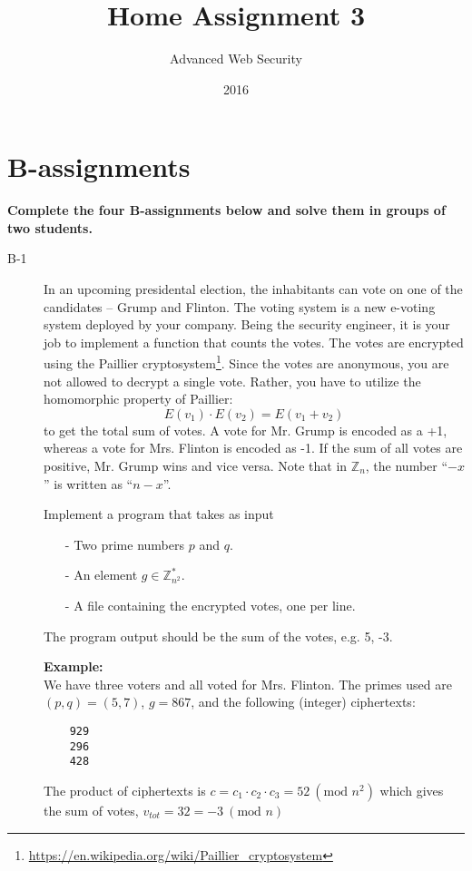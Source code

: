 \documentclass{article}
\begin{document}
\title{Home Assignment 3}
\author{Advanced Web Security}
\date{2016}

\maketitle

\section*{B-assignments}
\textbf{Complete the four B-assignments below and solve them in groups of two students.}

\begin{description}

	\item[B-1]{In an upcoming presidental election, the inhabitants can vote on one of the candidates --
	Grump and Flinton. The voting system is a new e-voting system deployed by your company. Being the
	security engineer, it is your job to implement a function that counts the votes. The votes are encrypted
	using the Paillier cryptosystem\footnote{\url{https://en.wikipedia.org/wiki/Paillier_cryptosystem}}. Since the votes are anonymous, you are not allowed to decrypt a single vote.
	Rather, you have to utilize the homomorphic property of Paillier:
	\[
	E(v_1) \cdot E(v_2) = E(v_1 + v_2)
	\]	
	to get the total sum of votes. A vote for Mr. Grump is encoded as a +1, whereas a vote for Mrs. Flinton
	is encoded as -1. If the sum of all votes are positive, Mr. Grump wins and vice versa. Note that in
	$\mathbb{Z}_n$, the number ``$-x$'' is written as ``$n-x$''.
    
    Implement a program that takes as input
	\begin{itemize}
		\item[-] Two prime numbers $p$ and $q$.
		\item[-] An element $g \in \mathbb{Z}_{n^2}^{*}$.
		\item[-] A file containing the encrypted votes, one per line.
	\end{itemize}

	The program output should be the sum of the votes, e.g. 5, -3.
	
	\textbf{Example:}\\
	We have three voters and all voted for Mrs. Flinton. The primes used are
	$(p, q) = (5, 7)$, $g = 867$, and the following (integer) ciphertexts:
	\begin{verbatim}
	929
	296
	428
	\end{verbatim}
	The product of ciphertexts is $c = c_1 \cdot c_2 \cdot c_3 = 52 ~(\textrm{mod } n^2)$
	which gives the sum of votes, $v_{tot} = 32 = -3 ~(\textrm{mod } n)$
	
}
\end{description}
\end{document}

